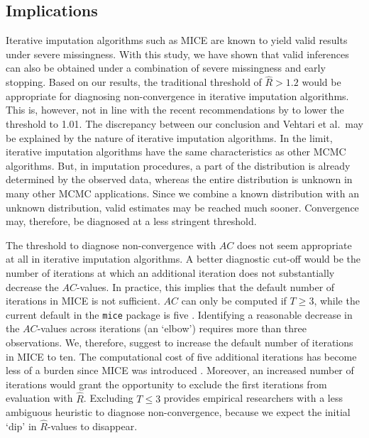 \documentclass[Royal,times,sageh]{sagej}
\begin{document}
\hypertarget{implications}{%
\subsection{Implications}\label{implications}}

Iterative imputation algorithms such as MICE are known to yield valid results under severe missingness. With this study, we have shown that valid inferences can also be obtained under a combination of severe missingness and early stopping. Based on our results, the traditional threshold of \(\widehat{R}> 1.2\) would be appropriate for diagnosing non-convergence in iterative imputation algorithms. This is, however, not in line with the recent recommendations by \citet{veht19} to lower the threshold to 1.01. The discrepancy between our conclusion and Vehtari et al.~may be explained by the nature of iterative imputation algorithms. In the limit, iterative imputation algorithms have the same characteristics as other MCMC algorithms. But, in imputation procedures, a part of the distribution is already determined by the observed data, whereas the entire distribution is unknown in many other MCMC applications. Since we combine a known distribution with an unknown distribution, valid estimates may be reached much sooner. Convergence may, therefore, be diagnosed at a less stringent threshold.

The threshold to diagnose non-convergence with \(AC\) does not seem appropriate at all in iterative imputation algorithms. A better diagnostic cut-off would be the number of iterations at which an additional iteration does not substantially decrease the \(AC\)-values. In practice, this implies that the default number of iterations in MICE is not sufficient. \(AC\) can only be computed if \(T\geq3\), while the current default in the \texttt{mice} package is five \citep{mice}. Identifying a reasonable decrease in the \(AC\)-values across iterations (an `elbow') requires more than three observations. We, therefore, suggest to increase the default number of iterations in MICE to ten. The computational cost of five additional iterations has become less of a burden since MICE was introduced \citeyearpar{mice}. Moreover, an increased number of iterations would grant the opportunity to exclude the first iterations from evaluation with \(\widehat{R}\). Excluding \(T\leq3\) provides empirical researchers with a less ambiguous heuristic to diagnose non-convergence, because we expect the initial `dip' in \(\widehat{R}\)-values to disappear.
\end{document}
